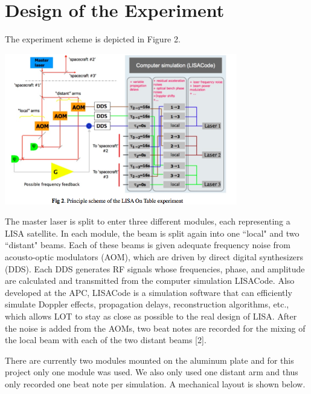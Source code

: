 \documentclass[11 pt]{article}
\begin{document}
\section{Design of the Experiment}

\indent\indent The experiment scheme is depicted in Figure 2.\\
\begin{center}\includegraphics[width=4in]{principle.png}\\\end{center} The master laser is split to enter three different modules, each representing a LISA satellite. In each module, the beam is split again into one ``local" and two ``distant" beams. Each of these beams is given adequate frequency noise from acousto-optic modulators (AOM), which are driven by direct digital synthesizers (DDS). Each DDS generates RF signals whose frequencies, phase, and amplitude are calculated and transmitted from the computer simulation LISACode. Also developed at the APC, LISACode is a simulation software that can efficiently simulate Doppler effects, propagation delays, reconstruction algorithms, etc., which allows LOT to stay as close as possible to the real design of LISA. After the noise is added from the AOMs, two beat notes are recorded for the mixing of the local beam with each of the two distant beams [2].




There are currently two modules mounted on the aluminum plate and for this project only one module was used. We also only used one distant arm and thus only recorded one beat note per simulation. A mechanical layout is shown below.
\end{document}
